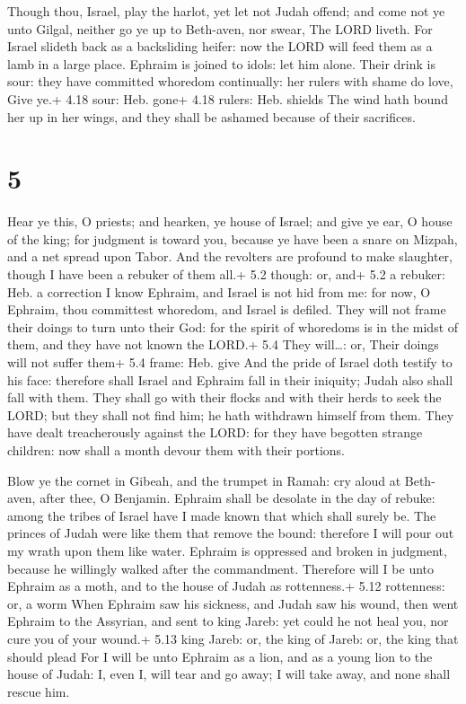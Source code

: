  Though thou, Israel, play the harlot, yet let not Judah
offend; and come not ye unto Gilgal, neither go ye up to Beth-aven, nor
swear, The LORD liveth.  For Israel slideth back as a
backsliding heifer: now the LORD will feed them as a lamb in a large
place.  Ephraim is joined to idols: let him alone.
 Their drink is sour: they have committed whoredom
continually: her rulers with shame do love, Give ye.+ 4.18 sour: Heb.
gone+ 4.18 rulers: Heb. shields  The wind hath bound her up
in her wings, and they shall be ashamed because of their sacrifices.

\hypertarget{section-4}{%
\section{5}\label{section-4}}

 Hear ye this, O priests; and hearken, ye house of Israel;
and give ye ear, O house of the king; for judgment is toward you,
because ye have been a snare on Mizpah, and a net spread upon Tabor.
 And the revolters are profound to make slaughter, though I
have been a rebuker of them all.+ 5.2 though: or, and+ 5.2 a rebuker:
Heb. a correction  I know Ephraim, and Israel is not hid
from me: for now, O Ephraim, thou committest whoredom, and Israel is
defiled.  They will not frame their doings to turn unto
their God: for the spirit of whoredoms is in the midst of them, and they
have not known the LORD.+ 5.4 They will\ldots: or, Their doings will not
suffer them+ 5.4 frame: Heb. give  And the pride of Israel
doth testify to his face: therefore shall Israel and Ephraim fall in
their iniquity; Judah also shall fall with them.  They shall
go with their flocks and with their herds to seek the LORD; but they
shall not find him; he hath withdrawn himself from them. 
They have dealt treacherously against the LORD: for they have begotten
strange children: now shall a month devour them with their portions.

 Blow ye the cornet in Gibeah, and the trumpet in Ramah: cry
aloud at Beth-aven, after thee, O Benjamin.  Ephraim shall
be desolate in the day of rebuke: among the tribes of Israel have I made
known that which shall surely be.  The princes of Judah
were like them that remove the bound: therefore I will pour out my wrath
upon them like water.  Ephraim is oppressed and broken in
judgment, because he willingly walked after the commandment.
 Therefore will I be unto Ephraim as a moth, and to the
house of Judah as rottenness.+ 5.12 rottenness: or, a worm 
When Ephraim saw his sickness, and Judah saw his wound, then went
Ephraim to the Assyrian, and sent to king Jareb: yet could he not heal
you, nor cure you of your wound.+ 5.13 king Jareb: or, the king of
Jareb: or, the king that should plead  For I will be unto
Ephraim as a lion, and as a young lion to the house of Judah: I, even I,
will tear and go away; I will take away, and none shall rescue him.

